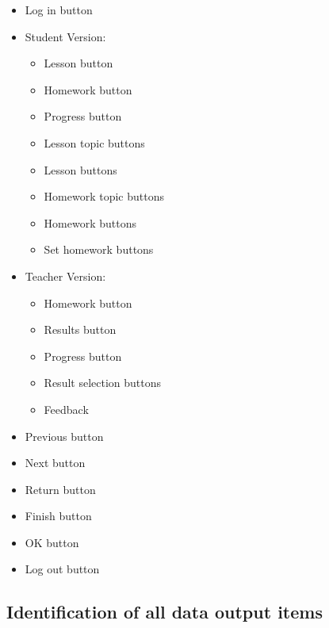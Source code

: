 \begin{itemize}
	\begin{itemize}
		\item Log in button
		\item Student Version:
		\begin{itemize}
			\item Lesson button
			\item Homework button
			\item Progress button
			\item Lesson topic buttons	
			\item Lesson buttons
			\item Homework topic buttons
			\item Homework buttons
			\item Set homework buttons
		\end{itemize}
		\item Teacher Version:
		\begin{itemize}
			\item Homework button
			\item Results button
			\item Progress button
			\item Result selection buttons
			\item Feedback
		\end{itemize}
		\item Previous button
		\item Next button
		\item Return button
		\item Finish button
		\item OK button
		\item Log out button
	\end{itemize}
\end{itemize}

\subsection{Identification of all data output items}

